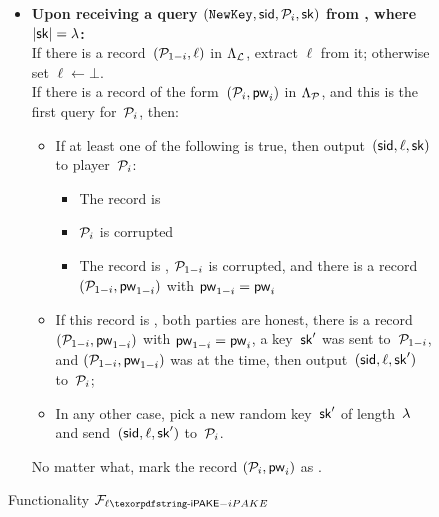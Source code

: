 \begin{figure}[htbp]
\begin{fboxenv}
\begin{minipage}{0.95\textwidth}
\begin{itemize}
\begin{itemize}
		\end{itemize}
		\vspace{3mm}
	\item
		\textbf{Upon receiving a query
			$(\texttt{NewKey},\mathsf{sid},\mathcal{P}_{i},\mathsf{sk})$ from \Sim, where $|\mathsf{sk}|=\lambda$: } \\
		If there is a record~$(\mathcal{P}_{1-i},\ell)$ in $\Lambda_{\mathcal{L}}$, extract $\ell$ from it; otherwise set $\ell\gets\bot$.\\
		If there is a record of the form~$(\mathcal{P}_{i},\mathsf{pw}_{i})$ in $\Lambda_{\mathcal{P}}$, and this is the first \NewKey query for~$\mathcal{P}_{i}$, then:
				\begin{itemize}
					\item If at least one of the following is true, then output~$(\mathsf{sid},\ell,\mathsf{sk})$ to player~$\mathcal{P}_{i}$:
						\begin{itemize}
							\item The record is 
							\item $\mathcal{P}_{i}$ is corrupted
							\item The record is , $\mathcal{P}_{1-i}$ is corrupted, and there is a record~$(\mathcal{P}_{1-i},\mathsf{pw}_{1-i})$ with $\mathsf{pw}_{1-i}=\mathsf{pw}_{i}$
						\end{itemize}
					\item If this record is , both parties are honest, there is a record~$(\mathcal{P}_{1-i},\mathsf{pw}_{1-i})$ with $\mathsf{pw}_{1-i}=\mathsf{pw}_{i}$, a key~$\mathsf{sk}'$ was sent to~$\mathcal{P}_{1-i}$,
						and $(\mathcal{P}_{1-i},\mathsf{pw}_{1-i})$ was  at the time, then output~$(\mathsf{sid},\ell,\mathsf{sk}')$ to~$\mathcal{P}_{i}$;
					\item In any other case, pick a new random key~$\mathsf{sk}'$ of length~$\lambda$ and send~$(\mathsf{sid},\ell,\mathsf{sk}')$ to~$\mathcal{P}_{i}$.
				\end{itemize}
			No matter what, mark the record $(\mathcal{P}_{i},\mathsf{pw}_{i})$ as .
\end{itemize}
\end{minipage}
\end{fboxenv}
\caption{Functionality $\FliPAKE$}\label{fig:func-liPAKE}
\end{figure}

